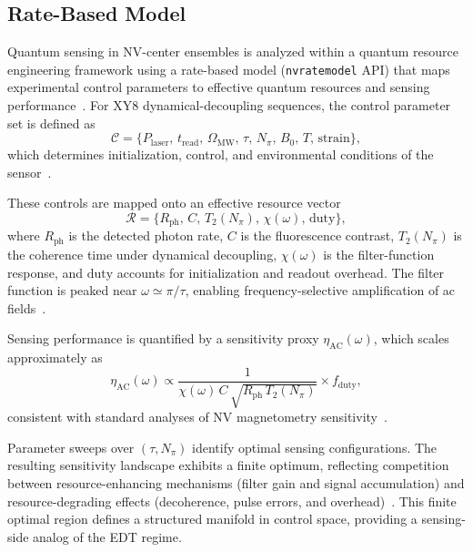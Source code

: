 ﻿\documentclass[aps,prx,reprint,superscriptaddress,longbibliography,floatfix]{revtex4-2}
\begin{document}
\subsection{Rate-Based Model}

Quantum sensing in NV-center ensembles is analyzed within a quantum resource engineering framework using a rate-based model (\texttt{nvratemodel} API) that maps experimental control parameters to effective quantum resources and sensing performance~\cite{NVRateModel2023,Degen2017,Barry2020}. For XY8 dynamical-decoupling sequences, the control parameter set is defined as
\begin{equation}
\mathcal{C} = \{P_{\mathrm{laser}},\, t_{\mathrm{read}},\, \Omega_{\mathrm{MW}},\, \tau,\, N_{\pi},\, B_0,\, T,\, \mathrm{strain}\},
\end{equation}
which determines initialization, control, and environmental conditions of the sensor~\cite{Casola2018}.

These controls are mapped onto an effective resource vector
\begin{equation}
\mathcal{R} = \{R_{\mathrm{ph}},\, C,\, T_2(N_{\pi}),\, \chi(\omega),\, \mathrm{duty}\},
\end{equation}
where $R_{\mathrm{ph}}$ is the detected photon rate, $C$ is the fluorescence contrast, $T_2(N_{\pi})$ is the coherence time under dynamical decoupling, $\chi(\omega)$ is the filter-function response, and $\mathrm{duty}$ accounts for initialization and readout overhead. The filter function is peaked near $\omega \simeq \pi/\tau$, enabling frequency-selective amplification of ac fields~\cite{Cywinski2008}.

Sensing performance is quantified by a sensitivity proxy $\eta_{\mathrm{AC}}(\omega)$, which scales approximately as
\begin{equation}
\eta_{\mathrm{AC}}(\omega) \propto \frac{1}{\chi(\omega)\,C\,\sqrt{R_{\mathrm{ph}}\,T_2(N_{\pi})}} \times f_{\mathrm{duty}},
\end{equation}
consistent with standard analyses of NV magnetometry sensitivity~\cite{Degen2017,Barry2020}.

Parameter sweeps over $(\tau, N_{\pi})$ identify optimal sensing configurations. The resulting sensitivity landscape exhibits a finite optimum, reflecting competition between resource-enhancing mechanisms (filter gain and signal accumulation) and resource-degrading effects (decoherence, pulse errors, and overhead)~\cite{Cywinski2008,Casola2018}. This finite optimal region defines a structured manifold in control space, providing a sensing-side analog of the EDT regime.
\end{document}
